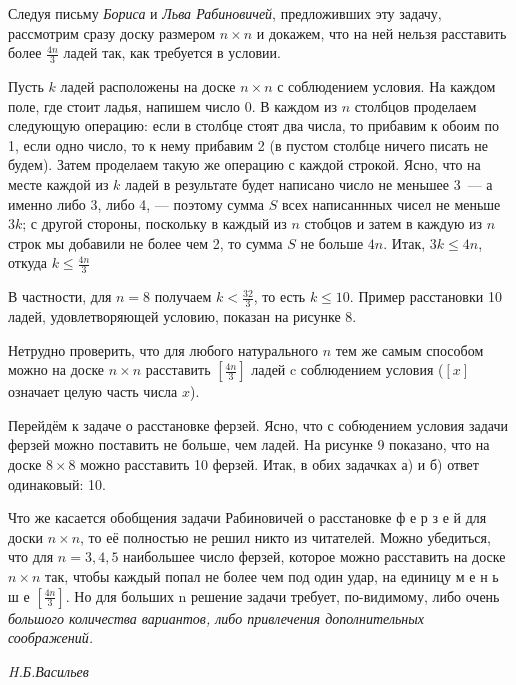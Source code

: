 \begin{minipage}{.5\textwidth}
   \hspace{0.5cm}Следуя письму \textit{Бориса} и \textit{Льва Рабиновичей}, предложивших эту задачу, рассмотрим сразу доску размером $n\times n$ и докажем, что на ней нельзя расставить более $\frac{4n}{3}$ ладей так, как требуется в условии.
    
    \hspace{0.5cm}Пусть $k$ ладей расположены на доске  $n\times n$ с соблюдением условия. На каждом поле, где стоит ладья, напишем число 0. В каждом из $n$ столбцов проделаем следующую операцию: если в столбце стоят два числа, то прибавим к обоим по 1, если одно число, то к нему прибавим 2 (в пустом столбце ничего писать не будем). Затем проделаем такую же операцию с каждой строкой. Ясно, что на месте каждой из $k$ ладей в результате будет написано число не меньшее 3~--- а именно либо 3, либо 4, --- поэтому сумма $S$ всех написаннных чисел не меньше $3k$; с другой стороны, поскольку в каждый из $n$ стобцов и затем в каждую из $n$ строк мы добавили не более чем 2, то сумма $S$ не больше $4n$. Итак, $3k\le4n$, откуда $k\le\frac{4n}{3}$

    \hspace{0.5cm}В частности, для $n=8$ получаем $k<\frac{32}{3}$, то есть $k\leq10$. Пример расстановки 10 ладей, удовлетворяющей условию, показан на рисунке 8.

    \hspace{0.5cm}Нетрудно проверить, что для любого натурального $n$ тем же самым способом можно на доске $n\times n$ расставить $[\frac{4n}{3}]$ ладей c соблюдением условия ($[x]$ означает целую часть числа $x$). 
    
    \hspace{0.5cm}Перейдём к задаче о расстановке ферзей. Ясно, что с собюдением условия задачи ферзей можно поставить не больше, чем ладей. На рисунке 9 показано, что на доске $8\times 8$ можно расставить 10 ферзей. Итак, в обих задачках а) и б) ответ одинаковый: 10.

    \hspace{0.5cm}Что же касается обобщения задачи Рабиновичей о расстановке ф е р з е й для доски $n\times n$, то её полностью не решил никто из читателей. Можно убедиться, что для $n=3,4,5$ наибольшее число ферзей, которое можно расставить на доске $n\times n$ так, чтобы каждый попал не более чем под один удар, на единицу м е н ь ш е $[\frac{4n}{3}]$. Но для больших n решение задачи требует, по-видимому, либо очень \emph{большого количества вариантов, либо привлечения дополнительных соображений.}
    \begin{flushright}
        \textsl{H.Б.Васильев}
    \end{flushright}


\end{minipage}

